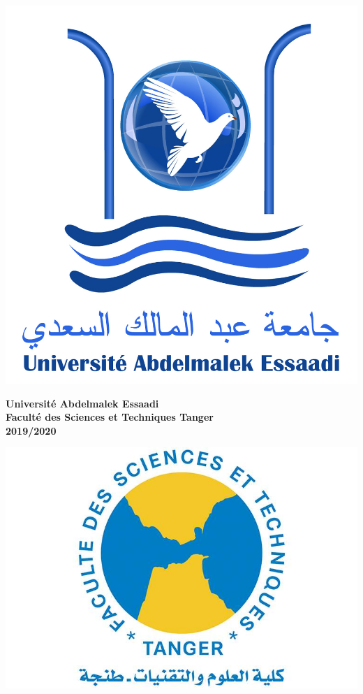\begin{titlepage}

\noindent
\begin{minipage}{0.15\textwidth}
      \includegraphics[width=\linewidth]{resources/uae.jpg}
\end{minipage}
\hfill
\begin{minipage}{0.5\textwidth}
  \begin{center}
    \textbf{\large Université Abdelmalek Essaadi}\\[0.3cm] %
    \textbf{\large Faculté des Sciences et Techniques Tanger}\\[0.5cm] %
    \textbf{\large 2019/2020}\\[1.5cm]
  \end{center}
    
\end{minipage}
\hfill
\begin{minipage}{0.15\textwidth}
  \includegraphics[width=\linewidth]{resources/fstt.jpg}
\end{minipage}


\end{titlepage}
